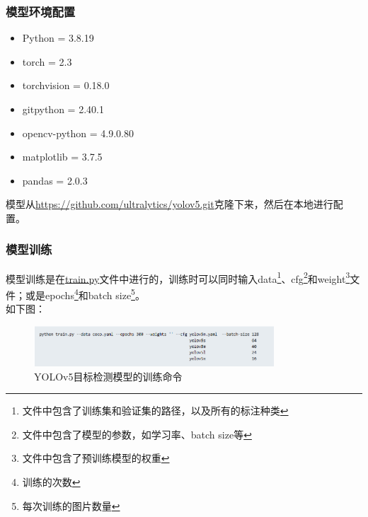 \documentclass{nwputhesis}
\begin{document}
\subsubsection{模型环境配置}
\begin{itemize}
    \item Python = 3.8.19
    \item torch = 2.3
    \item torchvision = 0.18.0
    \item gitpython = 2.40.1
    \item opencv-python = 4.9.0.80
    \item matplotlib = 3.7.5
    \item pandas = 2.0.3
\end{itemize}
模型从\underline{https://github.com/ultralytics/yolov5.git}克隆下来，然后在本地进行配置。

\subsubsection{模型训练}
\indent 模型训练是在\underline{train.py}文件中进行的，训练时可以同时输入data\footnote{文件中包含了训练集和验证集的路径，以及所有的标注种类}、cfg\footnote{文件中包含了模型的参数，如学习率、batch size等}和weight\footnote{文件中包含了预训练模型的权重}文件；或是epochs\footnote{训练的次数}和batch size\footnote{每次训练的图片数量}。
\\
如下图：
\begin{figure}[H]
    \centering
    \includegraphics[width=0.8\textwidth]{picture/2.png}
    \caption{YOLOv5目标检测模型的训练命令}
\end{figure}
\end{document}
